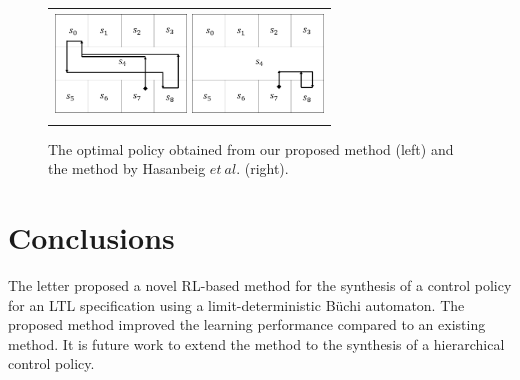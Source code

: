 \documentclass[letterpaper, 10 pt, conference]{ieeeconf}  %
\begin{document}
\begin{figure}[tbp]
	\centering
	\begin{tabular}{c}

		\begin{minipage}{0.499\hsize}
			\includegraphics[bb=0 0 341 256, height = 2.8cm, width=3.5cm]{proposed_policy.png}
		\end{minipage}

		\begin{minipage}{0.499\hsize}
			\centering
			\includegraphics[bb=0 0 341 257, height = 2.8cm, width=3.5cm]{Abate_policy.png}
		\end{minipage}
	\end{tabular}

	\caption{The optimal policy obtained from our proposed method (left) and the method by Hasanbeig $et\ al.$\cite{HAK2019} (right).}
	\label{optimal}
\end{figure}

\section{Conclusions}

The letter proposed a novel RL-based method for the synthesis of a control policy for an LTL specification using a limit-deterministic B\"{u}chi automaton.
The proposed method improved the learning performance compared to an existing method.
It is future work to extend the method to the synthesis of a hierarchical control policy.





\end{document}

